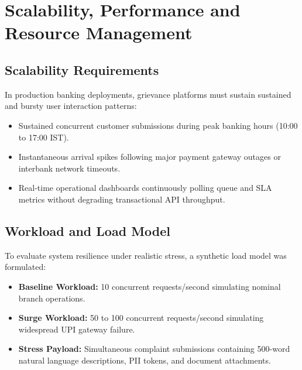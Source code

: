 \chapter{Scalability, Performance and Resource Management}

\section{Scalability Requirements}
In production banking deployments, grievance platforms must sustain sustained and bursty user interaction patterns:
\begin{itemize}
    \item Sustained concurrent customer submissions during peak banking hours (10:00 to 17:00 IST).
    \item Instantaneous arrival spikes following major payment gateway outages or interbank network timeouts.
    \item Real-time operational dashboards continuously polling queue and SLA metrics without degrading transactional API throughput.
\end{itemize}

\section{Workload and Load Model}
To evaluate system resilience under realistic stress, a synthetic load model was formulated:
\begin{itemize}
    \item \textbf{Baseline Workload:} 10 concurrent requests/second simulating nominal branch operations.
    \item \textbf{Surge Workload:} 50 to 100 concurrent requests/second simulating widespread UPI gateway failure.
    \item \textbf{Stress Payload:} Simultaneous complaint submissions containing 500-word natural language descriptions, PII tokens, and document attachments.
\end{itemize}


